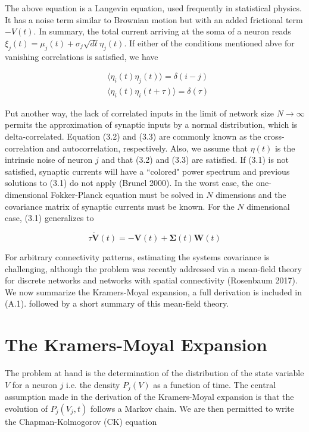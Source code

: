 \documentclass{ucetd}
\begin{document}
The above equation is a Langevin equation, used frequently in statistical physics. It has a noise term similar to Brownian motion but with an added frictional term $-V(t)$. In summary, the total current arriving at the soma of a neuron reads $\xi_{j}(t) = \mu_{j}(t) + \sigma_{j}\sqrt{dt}\eta_{j}(t)$. If either of the conditions mentioned abve for vanishing correlations is satisfied, we have

\begin{align}
&\langle \eta_{i}(t)\eta_{j}(t)\rangle = \delta(i-j)\\
&\langle \eta_{i}(t)\eta_{i}(t+\tau)\rangle = \delta(\tau)
\end{align}

Put another way, the lack of correlated inputs in the limit of network size $N\rightarrow \infty$ permits the approximation of synaptic inputs by a normal distribution, which is delta-correlated. Equation (3.2) and (3.3) are commonly known as the cross-correlation and autocorrelation, respectively. Also, we assume that $\eta(t)$ is the intrinsic noise of neuron $j$ and that (3.2) and (3.3) are satisfied. If (3.1) is not satisfied, synaptic currents will have a ``colored" power spectrum and previous solutions to (3.1) do not apply (Brunel 2000). In the worst case, the one-dimensional Fokker-Planck equation must be solved in $N$ dimensions and the covariance matrix of synaptic currents must be known. For the $N$ dimensional case, (3.1) generalizes to 

\begin{equation}
\tau\dot{\mathbf{V}}(t) = -\mathbf{V}(t) + \mathbf{\Sigma}(t)\mathbf{W}(t)
\end{equation}

For arbitrary connectivity patterns, estimating the systems covariance is challenging, although the problem was recently addressed via a mean-field theory for discrete networks and networks with spatial connectivity (Rosenbaum 2017). We now summarize the Kramers-Moyal expansion, a full derivation is included in (A.1). followed by a short summary of this mean-field theory.

\section{The Kramers-Moyal Expansion}

The problem at hand is the determination of the distribution of the state variable $V$ for a neuron $j$ i.e. the density $P_{j}(V)$ as a function of time. The central assumption made in the derivation of the Kramers-Moyal expansion is that the evolution of $P_{j}(V_{j},t)$ follows a Markov chain. We are then permitted to write the Chapman-Kolmogorov (CK) equation
\end{document}

